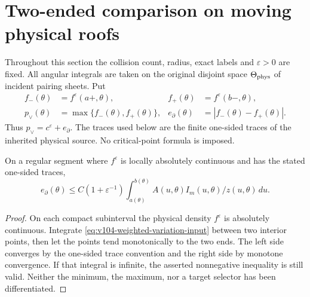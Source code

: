 \section{Two-ended comparison on moving physical roofs}
\label{sec:v107-envelope}
Throughout this section the collision count, radius, exact labels and
$\varepsilon>0$ are fixed. All angular integrals are taken on the
original disjoint space $\Theta_{\rm phys}$ of incident pairing sheets. Put
\begin{equation}\label{eq:v107-envelope}
 \begin{aligned}
 f_-(\theta)&=f^\varepsilon(a+,\theta),&
 f_+(\theta)&=f^\varepsilon(b-,\theta),\\
 p_\vee(\theta)&=\max\{f_-(\theta),f_+(\theta)\},&
 e_\partial(\theta)&=|f_-(\theta)-f_+(\theta)|.
 \end{aligned}
\end{equation}
Thus $p_\vee=c^\varepsilon+e_\partial$.
The traces used below are the finite one-sided traces of the
inherited physical source. No critical-point formula is imposed.

\begin{lemma}\label{lem:v107-endpoint}
On a regular segment where $f^\varepsilon$ is locally absolutely
continuous and has the stated one-sided traces,
\begin{equation}\label{eq:v107-endpoint-charge}
 e_\partial(\theta)\le C(1+\varepsilon^{-1})
       \int_{a(\theta)}^{b(\theta)} A(u,\theta)I_m(u,\theta)/z(u,\theta)\,du.
\end{equation}
\end{lemma}
\begin{proof}
On each compact subinterval the physical density $f^\varepsilon$
is absolutely continuous. Integrate
\eqref{eq:v104-weighted-variation-input} between two interior
points, then let the points tend monotonically to the two ends.
The left side converges by the one-sided trace convention and the
right side by monotone convergence. If that integral is infinite,
the asserted nonnegative inequality is still valid. Neither the
minimum, the maximum, nor a target selector has been differentiated.
\end{proof}

